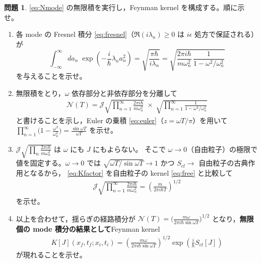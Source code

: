 \documentclass[dvipdfmx, uplatex]{jsarticle}
\theoremstyle{definition}
\newtheorem{prob}{問題}
\begin{document}
\begin{prob}\label{prob:kernel}
\eqref{eq:Nmode} の無限積を実行し，Feynman kernel を構成する。順に示せ。
\begin{enumerate}
\item 各 mode の Fresnel 積分 \eqref{eq:fresnel}（$\Re(i\lambda_n)\ge0$ は $i\epsilon$ 処方で保証される）が
\[
    \int_{-\infty}^{\infty}\! da_n\;\exp\!\left(-\frac{i}{\hbar}\lambda_n a_n^2\right)
    =\sqrt{\frac{\pi\hbar}{i\lambda_n}}
    =\sqrt{\frac{2\pi i\hbar}{m\omega_n^2}\,\frac{1}{1-\omega^2/\omega_n^2}}
\]
を与えることを示せ。
\item 無限積をとり，$\omega$ 依存部分と非依存部分を分離して
\begin{align}
    \mathcal{N}(T)
    =\mathcal{J}\sqrt{\prod_{n=1}^{\infty}\frac{2\pi i\hbar}{m\omega_n^2}}\;
    \times\;\sqrt{\prod_{n=1}^{\infty}\frac{1}{1-\omega^2/\omega_n^2}}
\end{align}
と書けることを示し，Euler の乗積 \eqref{eq:euler}（$z=\omega T/\pi$）を用いて
$\displaystyle\prod_{n=1}^{\infty}\Big(1-\frac{\omega^2}{\omega_n^2}\Big)=\frac{\sin\omega T}{\omega T}$
を示せ。
\item $\displaystyle\mathcal{J}\sqrt{\prod_n\frac{2\pi i\hbar}{m\omega_n^2}}$ は $\omega$ にも $J$ にもよらない。
そこで $\omega\to0$（自由粒子）の極限で値を固定する。$\omega\to0$ では
$\sqrt{\omega T/\sin\omega T}\to1$ かつ $S_{cl}\to$ 自由粒子の古典作用となるから，
\eqref{eq:Kfactor} を自由粒子の kernel \eqref{eq:free} と比較して
\begin{align}
    \mathcal{J}\sqrt{\prod_{n=1}^{\infty}\frac{2\pi i\hbar}{m\omega_n^2}}
    =\left(\frac{m}{2\pi i\hbar T}\right)^{1/2}
\end{align}
を示せ。
\item 以上を合わせて，揺らぎの経路積分が
$\displaystyle\mathcal{N}(T)=\Big(\frac{m\omega}{2\pi i\hbar\sin\omega T}\Big)^{1/2}$
となり，\textbf{無限個の mode 積分の結果として}Feynman kernel
\begin{align}
    K[J](x_f,t_f;x_i,t_i)
    =\left(\frac{m\omega}{2\pi i\hbar\sin\omega T}\right)^{1/2}
    \exp\!\left(\frac{i}{\hbar}S_{cl}[J]\right)
\label{eq:kernel}
\end{align}
が現れることを示せ。
\end{enumerate}
\end{prob}

\end{document}
